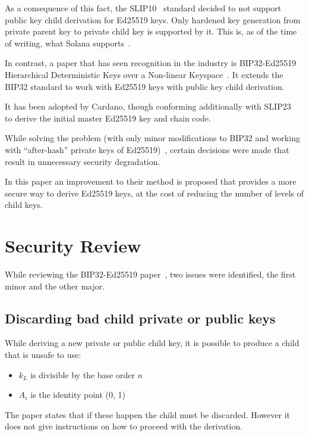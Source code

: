 \documentclass[12pt, a4paper, twocolumn]{article}
\begin{document}
As a consequence of this fact, the SLIP10~\cite{SLIP10} standard decided to not support public key child derivation for Ed25519 keys. Only hardened key generation from private parent key to private child key is supported by it. This is, as of the time of writing, what Solana supports~\cite{SolanaBip32}. 

In contrast, a paper that has seen recognition in the industry is BIP32-Ed25519
Hierarchical Deterministic Keys over a Non-linear Keyspace~\cite{BIP32-Ed25519}. It extends the BIP32 standard to work with Ed25519 keys with public key child derivation.

It has been adopted by Cardano, though conforming additionally with SLIP23~\cite{SLIP23} to derive the initial master Ed25519 key and chain code.

While solving the problem (with only minor modifications to BIP32 and working with ``after-hash'' private keys of Ed25519)~\cite{BIP32-Ed25519}, certain decisions were made that result in unnecessary security degradation.

In this paper an improvement to their method is proposed that provides a more secure way to derive Ed25519 keys, at the cost of reducing the number of levels of child keys.


\section{Security Review}

While reviewing the BIP32-Ed25519 paper~\cite{BIP32-Ed25519}, two issues were identified, the first minor and the other major.

\subsection{Discarding bad child private or public keys}

While deriving a new private or public child key, it is possible to produce a child that is unsafe to use:

\begin{itemize}[label=\textendash, itemsep=-0.5em]
  \item $k_L$ is divisible by the base order $n$
  \item $A_i$ is the identity point (0, 1)
\end{itemize}

The paper states that if these happen the child must be discarded. However it does not give instructions on how to proceed with the derivation.
\end{document}
